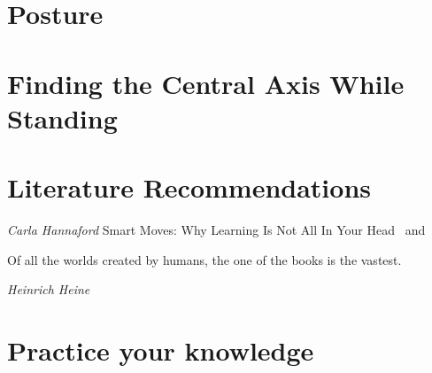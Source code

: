 \documentclass[../main.tex]{subfiles}
\begin{document}


\section{Posture}


\newpage

\section{Finding the Central Axis While Standing}




\section{Literature Recommendations}

\textit{Carla Hannaford} Smart Moves: Why Learning Is Not All In Your Head~\cite{BraingymE} and~\cite{BraingymD}

\epigraph{Of all the worlds created by humans, the one of the books is the vastest.}{\textit{Heinrich Heine}}

\section{Practice your knowledge}

\end{document}
